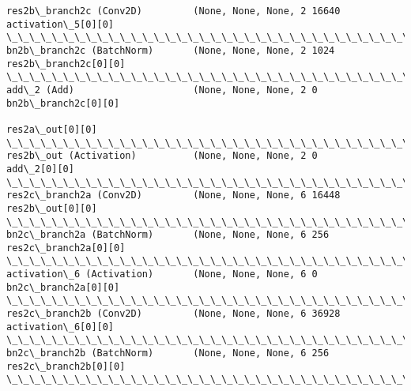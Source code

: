 \documentclass[11pt]{article}
\begin{document}
\begin{Verbatim}[commandchars=\\\{\}]
res2b\_branch2c (Conv2D)         (None, None, None, 2 16640       activation\_5[0][0]               
\_\_\_\_\_\_\_\_\_\_\_\_\_\_\_\_\_\_\_\_\_\_\_\_\_\_\_\_\_\_\_\_\_\_\_\_\_\_\_\_\_\_\_\_\_\_\_\_\_\_\_\_\_\_\_\_\_\_\_\_\_\_\_\_\_\_\_\_\_\_\_\_\_\_\_\_\_\_\_\_\_\_\_\_\_\_\_\_\_\_\_\_\_\_\_\_\_\_
bn2b\_branch2c (BatchNorm)       (None, None, None, 2 1024        res2b\_branch2c[0][0]             
\_\_\_\_\_\_\_\_\_\_\_\_\_\_\_\_\_\_\_\_\_\_\_\_\_\_\_\_\_\_\_\_\_\_\_\_\_\_\_\_\_\_\_\_\_\_\_\_\_\_\_\_\_\_\_\_\_\_\_\_\_\_\_\_\_\_\_\_\_\_\_\_\_\_\_\_\_\_\_\_\_\_\_\_\_\_\_\_\_\_\_\_\_\_\_\_\_\_
add\_2 (Add)                     (None, None, None, 2 0           bn2b\_branch2c[0][0]              
                                                                 res2a\_out[0][0]                  
\_\_\_\_\_\_\_\_\_\_\_\_\_\_\_\_\_\_\_\_\_\_\_\_\_\_\_\_\_\_\_\_\_\_\_\_\_\_\_\_\_\_\_\_\_\_\_\_\_\_\_\_\_\_\_\_\_\_\_\_\_\_\_\_\_\_\_\_\_\_\_\_\_\_\_\_\_\_\_\_\_\_\_\_\_\_\_\_\_\_\_\_\_\_\_\_\_\_
res2b\_out (Activation)          (None, None, None, 2 0           add\_2[0][0]                      
\_\_\_\_\_\_\_\_\_\_\_\_\_\_\_\_\_\_\_\_\_\_\_\_\_\_\_\_\_\_\_\_\_\_\_\_\_\_\_\_\_\_\_\_\_\_\_\_\_\_\_\_\_\_\_\_\_\_\_\_\_\_\_\_\_\_\_\_\_\_\_\_\_\_\_\_\_\_\_\_\_\_\_\_\_\_\_\_\_\_\_\_\_\_\_\_\_\_
res2c\_branch2a (Conv2D)         (None, None, None, 6 16448       res2b\_out[0][0]                  
\_\_\_\_\_\_\_\_\_\_\_\_\_\_\_\_\_\_\_\_\_\_\_\_\_\_\_\_\_\_\_\_\_\_\_\_\_\_\_\_\_\_\_\_\_\_\_\_\_\_\_\_\_\_\_\_\_\_\_\_\_\_\_\_\_\_\_\_\_\_\_\_\_\_\_\_\_\_\_\_\_\_\_\_\_\_\_\_\_\_\_\_\_\_\_\_\_\_
bn2c\_branch2a (BatchNorm)       (None, None, None, 6 256         res2c\_branch2a[0][0]             
\_\_\_\_\_\_\_\_\_\_\_\_\_\_\_\_\_\_\_\_\_\_\_\_\_\_\_\_\_\_\_\_\_\_\_\_\_\_\_\_\_\_\_\_\_\_\_\_\_\_\_\_\_\_\_\_\_\_\_\_\_\_\_\_\_\_\_\_\_\_\_\_\_\_\_\_\_\_\_\_\_\_\_\_\_\_\_\_\_\_\_\_\_\_\_\_\_\_
activation\_6 (Activation)       (None, None, None, 6 0           bn2c\_branch2a[0][0]              
\_\_\_\_\_\_\_\_\_\_\_\_\_\_\_\_\_\_\_\_\_\_\_\_\_\_\_\_\_\_\_\_\_\_\_\_\_\_\_\_\_\_\_\_\_\_\_\_\_\_\_\_\_\_\_\_\_\_\_\_\_\_\_\_\_\_\_\_\_\_\_\_\_\_\_\_\_\_\_\_\_\_\_\_\_\_\_\_\_\_\_\_\_\_\_\_\_\_
res2c\_branch2b (Conv2D)         (None, None, None, 6 36928       activation\_6[0][0]               
\_\_\_\_\_\_\_\_\_\_\_\_\_\_\_\_\_\_\_\_\_\_\_\_\_\_\_\_\_\_\_\_\_\_\_\_\_\_\_\_\_\_\_\_\_\_\_\_\_\_\_\_\_\_\_\_\_\_\_\_\_\_\_\_\_\_\_\_\_\_\_\_\_\_\_\_\_\_\_\_\_\_\_\_\_\_\_\_\_\_\_\_\_\_\_\_\_\_
bn2c\_branch2b (BatchNorm)       (None, None, None, 6 256         res2c\_branch2b[0][0]             
\_\_\_\_\_\_\_\_\_\_\_\_\_\_\_\_\_\_\_\_\_\_\_\_\_\_\_\_\_\_\_\_\_\_\_\_\_\_\_\_\_\_\_\_\_\_\_\_\_\_\_\_\_\_\_\_\_\_\_\_\_\_\_\_\_\_\_\_\_\_\_\_\_\_\_\_\_\_\_\_\_\_\_\_\_\_\_\_\_\_\_\_\_\_\_\_\_\_

\end{Verbatim}
\end{document}

